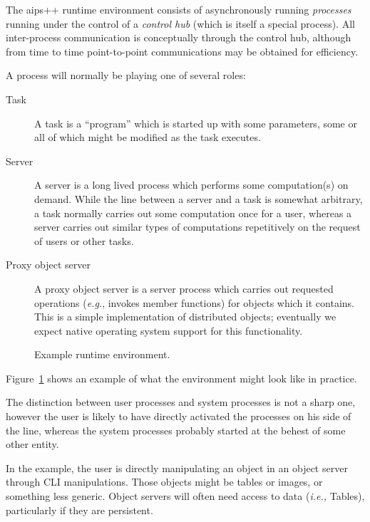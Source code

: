 The {\sc aips++} runtime environment consists of asynchronously running {\em
processes} running under the control of a {\em control hub} (which is
itself a special process). All inter-process communication is
conceptually through the control hub, although from time to time
point-to-point communications may be obtained for efficiency.

A process will normally be playing one of several roles:
\begin{description}
\item[Task]
      A task is a ``program'' which is started up with some
      parameters, some or all of which might be modified as the task
      executes.
\item[Server]
      A server is a long lived process which performs some
      computation(s) on demand. While the line between a server and a
      task is somewhat arbitrary, a task normally carries out some
      computation once for a user, whereas a server carries out
      similar types of computations repetitively on the request of
      users or other tasks.
\item[Proxy object server]
      A proxy object server is a server process which carries out
      requested operations ({\em e.g.}, invokes member functions) for objects
      which it contains.  This is a simple implementation of
      distributed objects; eventually we expect native operating
      system support for this functionality.
\end{description}

\begin{figure}
\epsfverbosetrue
\epsfysize=7.0in
\caption{Example runtime environment.}
\label{fig:environment}
\end{figure}

Figure~\ref{fig:environment} shows an example of what the environment
might look like in practice. 

The distinction between user processes and system processes is not a
sharp one, however the user is likely to have directly activated the
processes on his side of the line, whereas the system processes
probably started at the behest of some other entity.

In the example, the user is directly manipulating an object in an
object server through CLI manipulations. Those objects might be tables
or images, or something less generic. Object servers will often need
access to data ({\em i.e.,} Tables), particularly if they are
persistent.

